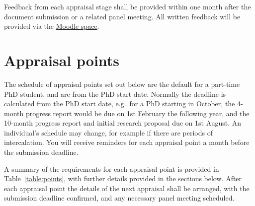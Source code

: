 \documentclass[12pt,a4paper]{article}
\begin{document}
Feedback from each appraisal stage shall be provided within one month after the document submission or a related panel meeting. All written feedback will be provided via the \href{https://modules.lancaster.ac.uk/course/view.php?id=7050}{Moodle space}.


\section{Appraisal points} \label{sec:points}

The schedule of appraisal points set out below are the default for a part-time PhD student, and are from the PhD start date. Normally the deadline is calculated from the PhD start date, e.g.\ for a PhD starting in October, the 4-month progress report would be due on 1st February the following year, and the 10-month progress report and initial research proposal due on 1st August. An individual's schedule may change, for example if there are periods of intercalation. You will receive reminders for each appraisal point a month before the submission deadline.

A summary of the requirements for each appraisal point is provided in Table~\ref{table:points}, with further details provided in the sections below. After each appraisal point the details of the next appraisal shall be arranged, with the submission deadline confirmed, and any necessary panel meeting scheduled.
\end{document}
